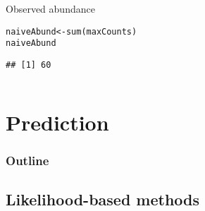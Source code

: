 \documentclass[color=usenames,dvipsnames]{beamer}\usepackage[]{graphicx}\usepackage[]{xcolor}
\makeatletter
\newcommand{\hldef}[1]{\textcolor[rgb]{0,0,0}{#1}}%
\newcommand{\hlkwb}[1]{\textcolor[rgb]{0,0.341,0.682}{#1}}%
\newcommand{\hlkwd}[1]{\textcolor[rgb]{0.004,0.004,0.506}{#1}}%
\newenvironment{kframe}{%
 \def\at@end@of@kframe{}%
 \ifinner\ifhmode%
  \def\at@end@of@kframe{\end{minipage}}%
  \begin{minipage}{\columnwidth}%
 \fi\fi%
 \def\FrameCommand##1{\hskip\@totalleftmargin \hskip-\fboxsep
 \colorbox{shadecolor}{##1}\hskip-\fboxsep
     \hskip-\linewidth \hskip-\@totalleftmargin \hskip\columnwidth}%
 \MakeFramed {\advance\hsize-\width
   \@totalleftmargin\z@ \linewidth\hsize
   \@setminipage}}%
 {\par\unskip\endMakeFramed%
 \at@end@of@kframe}
\newenvironment{knitrout}{}{} %
\makeatother
\begin{document}
\begin{frame}[fragile]
\begin{columns}
\begin{column}{0.6\textwidth}
\vfill
\small
Observed abundance \\
\begin{knitrout}\scriptsize
{}\color{fgcolor}\begin{kframe}
\begin{alltt}
\hldef{naiveAbund} \hlkwb{<-} \hlkwd{sum}\hldef{(maxCounts)}
\hldef{naiveAbund}
\end{alltt}
\begin{verbatim}
## [1] 60
\end{verbatim}
\end{kframe}
\end{knitrout}

  \end{column}
  \end{columns}
\end{frame}



\section{Prediction}



\begin{frame}
  \frametitle{Outline}
  \Large
  \tableofcontents[currentsection]
\end{frame}



\subsection{Likelihood-based methods}
\end{document}
